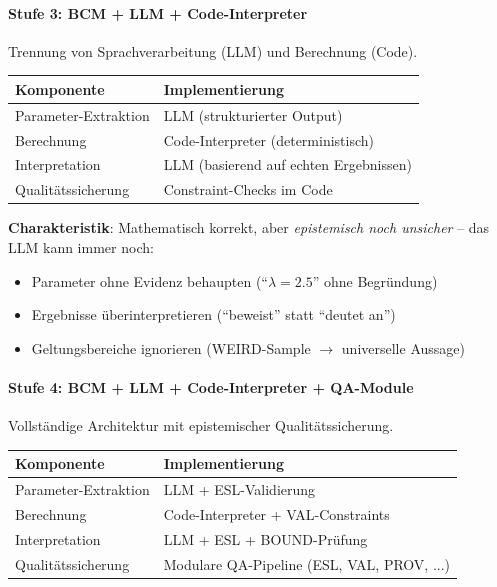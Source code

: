\paragraph{Stufe 3: BCM + LLM + Code-Interpreter}

Trennung von Sprachverarbeitung (LLM) und Berechnung (Code).

\begin{table}[h]
\centering
\small
\begin{tabular}{@{}ll@{}}
\toprule
\textbf{Komponente} & \textbf{Implementierung} \\
\midrule
Parameter-Extraktion & LLM (strukturierter Output) \\
Berechnung & Code-Interpreter (deterministisch) \\
Interpretation & LLM (basierend auf echten Ergebnissen) \\
Qualitätssicherung & Constraint-Checks im Code \\
\bottomrule
\end{tabular}
\end{table}

\textbf{Charakteristik}: Mathematisch korrekt, aber \textit{epistemisch noch unsicher} -- das LLM kann immer noch:
\begin{itemize}
    \item Parameter ohne Evidenz behaupten (``$\lambda = 2.5$'' ohne Begründung)
    \item Ergebnisse überinterpretieren (``beweist'' statt ``deutet an'')
    \item Geltungsbereiche ignorieren (WEIRD-Sample $\rightarrow$ universelle Aussage)
\end{itemize}

\paragraph{Stufe 4: BCM + LLM + Code-Interpreter + QA-Module}

Vollständige Architektur mit epistemischer Qualitätssicherung.

\begin{table}[h]
\centering
\small
\begin{tabular}{@{}ll@{}}
\toprule
\textbf{Komponente} & \textbf{Implementierung} \\
\midrule
Parameter-Extraktion & LLM + ESL-Validierung \\
Berechnung & Code-Interpreter + VAL-Constraints \\
Interpretation & LLM + ESL + BOUND-Prüfung \\
Qualitätssicherung & Modulare QA-Pipeline (ESL, VAL, PROV, ...) \\
\bottomrule
\end{tabular}
\end{table}


